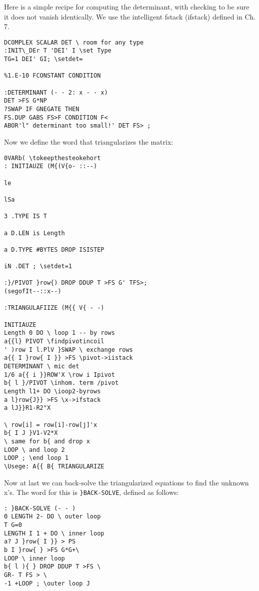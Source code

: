 Here is a simple recipe for computing the determinant, with
checking to be sure it does not vanish identically. We use the
intelligent fstack (ifstack) defined in Ch. 7.

\begin{verbatim}
DCOMPLEX SCALAR DET \ room for any type
:INIT\_DEr T 'DEI' I \set Type
TG=1 DEI' GI; \setdet=

%1.E-10 FCONSTANT CONDITION

:DETERMINANT (- - 2: x - - x)
DET >FS G*NP
?SWAP IF GNEGATE THEN
FS.DUP GABS FS>F CONDITION F<
ABOR'l" determinant too small!' DET FS> ;

\end{verbatim} 


Now we define the word that triangularizes the matrix:
\begin{verbatim}
0VARb( \tokeepthesteokehort
: INITIAUZE (M{(V{o- ::--)

le

lSa

3 .TYPE IS T

a D.LEN is Length

a D.TYPE #BYTES DROP ISISTEP

iN .DET ; \setdet=1

:}/PIVOT }row{) DROP DDUP T >FS G' TFS>;
(segofIt--::x--)

:TRIANGULAFIIZE (M{{ V{ - -)

INITIAUZE
Length 0 DO \ loop 1 -- by rows
a{{l} PIVOT \findpivotincoil
' )row I l.PlV }SWAP \ exchange rows
a{{ I }row{ I }} >FS \pivot->iistack
DETERMINANT \ mic det
1/6 a{{ i }}ROW'X \row i Ipivot
b{ l }/PIVOT \inhom. term /pivot
Length l1+ DO \ioop2-byrows
a l}row{J}} >FS \x->ifstack
a lJ}}R1-R2"X

\ row[i] = row[i]-row[j]'x
b{ I J }V1-V2*X
\ same for b{ and drop x
LOOP \ and loop 2
LOOP ; \end loop 1
\Usege: A{{ B{ TRIANGULARIZE
\end{verbatim}

Now at last we can back-solve the triangularized equations to find
the unknown x's. The word for this is \verb|}BACK-SOLVE|, defined
as follows:


\begin{verbatim}
: }BACK-SOLVE (- - )
0 LENGTH 2- DO \ outer loop
T G=0
LENGTH I 1 + DO \ inner loop
a? J }row{ I }} > PS
b I }row{ } >FS G*G+\
LOOP \ inner loop
b{ l ){ } DROP DDUP T >FS \
GR- T FS > \
-1 +LOOP ; \outer loop J
\end{verbatim} 

